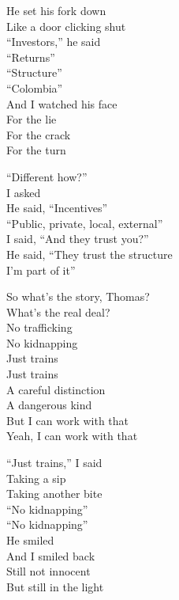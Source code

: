 \begin{lyrics}
He set his fork down\\
Like a door clicking shut\\
“Investors,” he said\\
“Returns”\\
“Structure”\\
“Colombia”\\
And I watched his face\\
For the lie\\
For the crack\\
For the turn

“Different how?”\\
I asked\\
He said, “Incentives”\\
“Public, private, local, external”\\
I said, “And they trust you?”\\
He said, “They trust the structure\\
I’m part of it”

So what’s the story, Thomas?\\
What’s the real deal?\\
No trafficking\\
No kidnapping\\
Just trains\\
Just trains\\
A careful distinction\\
A dangerous kind\\
But I can work with that\\
Yeah, I can work with that

“Just trains,” I said\\
Taking a sip\\
Taking another bite\\
“No kidnapping”\\
“No kidnapping”\\
He smiled\\
And I smiled back\\
Still not innocent\\
But still in the light
\end{lyrics}

